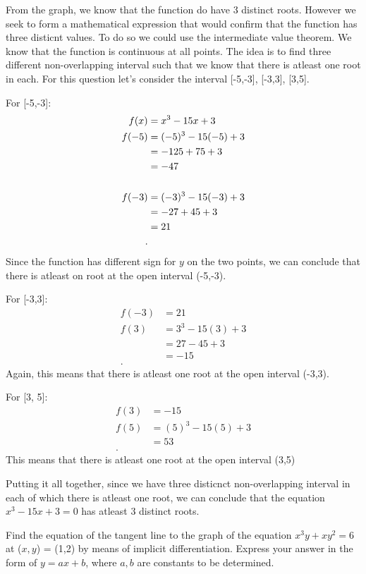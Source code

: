 \documentclass[a4paper]{article}
\begin{document}
From the graph, we know that the function do have 3 distinct roots. However we seek to form a mathematical expression that would confirm that the function has three disticnt values. To do so we could use the intermediate value theorem. We know that the function is continuous at all points. The idea is to find three different non-overlapping interval such that we know that there is atleast one root in each. For this question let's consider the interval [-5,-3], [-3,3], [3,5].

\noindent For [-5,-3]:
\begin{align*}
	f(x) &= x^3 - 15x + 3 \\
	f(-5) &= (-5)^3 - 15(-5) + 3 \\
	&= -125 + 75 + 3  \\
	&= -47 \\
	\vspace{5pt} \\
	f(-3) &= (-3)^3 - 15(-3) + 3 \\
	&= -27 + 45 + 3 \\
	&= 21 \\
.\end{align*}Since the function has different sign for $y$ on the two points, we can conclude that there is atleast on root at the open interval (-5,-3).

\noindent For [-3,3]:
 \begin{align*}
	 f(-3) &= 21 \\
	 f(3) &= 3^3 - 15(3) + 3 \\
	 &= 27 - 45 + 3 \\
	 &= -15 \\
.\end{align*} Again, this means that there is atleast one root at the open interval (-3,3).

\noindent For [3, 5]:
\begin{align*}
	f(3) &= -15 \\
	f(5) &= (5)^3 - 15(5) + 3 \\
	&= 53 \\
.\end{align*}This means that there is atleast one root at the open interval (3,5)


Putting it all together, since we have three disticnct non-overlapping interval in each of which there is atleast one root, we can conclude that the equation $x^3 - 15x + 3 = 0$ has atleast 3 distinct roots.  

\begin{tcolorbox}[title=Question 3]
	Find the equation of the tangent line to the graph of the equation $x^3y + xy^2 = 6$ at ($x,y$) = (1,2) by means of implicit differentiation. Express your answer in the form of $y = ax + b$, where $a,b$ are constants to be determined. 
\end{tcolorbox}
\end{document}
